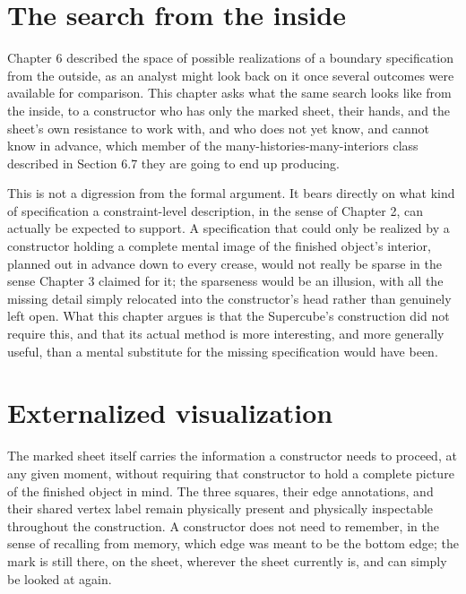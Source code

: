 \documentclass[11pt,oneside]{book}
\begin{document}
\hypertarget{the-search-from-the-inside}{%
\section{The search from the
inside}\label{the-search-from-the-inside}}

Chapter 6 described the space of possible realizations of a boundary
specification from the outside, as an analyst might look back on it once
several outcomes were available for comparison. This chapter asks what
the same search looks like from the inside, to a constructor who has
only the marked sheet, their hands, and the sheet's own resistance to
work with, and who does not yet know, and cannot know in advance, which
member of the many-histories-many-interiors class described in Section
6.7 they are going to end up producing.

This is not a digression from the formal argument. It bears directly on
what kind of specification a constraint-level description, in the sense
of Chapter 2, can actually be expected to support. A specification that
could only be realized by a constructor holding a complete mental image
of the finished object's interior, planned out in advance down to every
crease, would not really be sparse in the sense Chapter 3 claimed for
it; the sparseness would be an illusion, with all the missing detail
simply relocated into the constructor's head rather than genuinely left
open. What this chapter argues is that the Supercube's construction did
not require this, and that its actual method is more interesting, and
more generally useful, than a mental substitute for the missing
specification would have been.

\hypertarget{externalized-visualization}{%
\section{Externalized
visualization}\label{externalized-visualization}}

The marked sheet itself carries the information a constructor needs to
proceed, at any given moment, without requiring that constructor to hold
a complete picture of the finished object in mind. The three squares,
their edge annotations, and their shared vertex label remain physically
present and physically inspectable throughout the construction. A
constructor does not need to remember, in the sense of recalling from
memory, which edge was meant to be the bottom edge; the mark is still
there, on the sheet, wherever the sheet currently is, and can simply be
looked at again.
\end{document}
